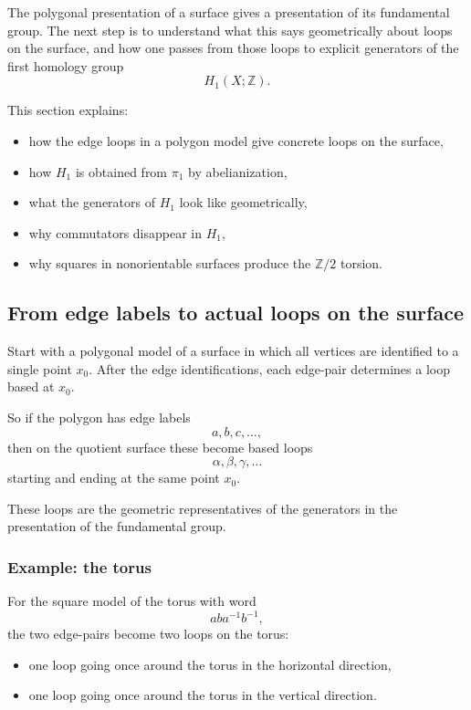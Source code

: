 \documentclass[12pt,a4paper]{article}
\newcommand{\Z}{\mathbb{Z}}
\theoremstyle{notespace}
\begin{document}
The polygonal presentation of a surface gives a presentation of its fundamental group. The next step is to understand what this says geometrically about loops on the surface, and how one passes from those loops to explicit generators of the first homology group
\[
H_1(X;\Z).
\]

This section explains:
\begin{itemize}
	\item how the edge loops in a polygon model give concrete loops on the surface,
	\item how \(H_1\) is obtained from \(\pi_1\) by abelianization,
	\item what the generators of \(H_1\) look like geometrically,
	\item why commutators disappear in \(H_1\),
	\item why squares in nonorientable surfaces produce the \(\Z/2\) torsion.
\end{itemize}

\subsection{From edge labels to actual loops on the surface}

Start with a polygonal model of a surface in which all vertices are identified to a single point \(x_0\). After the edge identifications, each edge-pair determines a loop based at \(x_0\).

So if the polygon has edge labels
\[
a,b,c,\dots,
\]
then on the quotient surface these become based loops
\[
\alpha,\beta,\gamma,\dots
\]
starting and ending at the same point \(x_0\).

These loops are the geometric representatives of the generators in the presentation of the fundamental group.

\subsubsection*{Example: the torus}

For the square model of the torus with word
\[
aba^{-1}b^{-1},
\]
the two edge-pairs become two loops on the torus:
\begin{itemize}
	\item one loop going once around the torus in the horizontal direction,
	\item one loop going once around the torus in the vertical direction.
\end{itemize}
\end{document}
